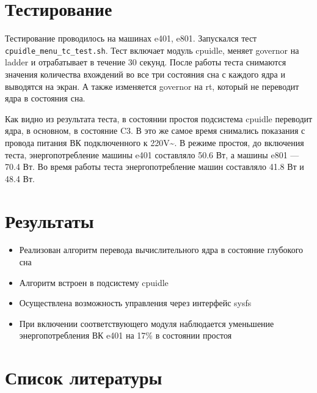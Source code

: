 \documentclass{article}
\begin{document}
%

\newpage
\section{Тестирование}
Тестирование проводилось на машинах e401, e801. Запускался тест \texttt{cpuidle\_menu\_tc\_test.sh}. Тест включает модуль cpuidle, меняет governor на ladder и отрабатывает в течение 30 секунд. После работы теста снимаются значения количества вхождений во все три состояния сна с каждого ядра и выводятся на экран. А также изменяется governor на rt, который не переводит ядра в состояния сна.

Как видно из результата теста, в состоянии простоя подсистема cpuidle переводит ядра, в основном, в состояние C3. В это же самое время снимались показания с провода питания ВК подключенного к 220V\textasciitilde. В режиме простоя, до включения теста, энергопотребление машины e401 составляло 50.6 Вт, а машины e801 --- 70.4 Вт. Во время работы теста энергопотребление машин составляло 41.8 Вт и 48.4 Вт.

\newpage
\section{Результаты}

\begin{itemize}
\item Реализован алгоритм перевода вычислительного ядра в состояние глубокого сна
\item Алгоритм встроен в подсистему cpuidle
\item Осуществлена возможность управления через интерфейс sysfs
\item При включении соответствующего модуля наблюдается уменьшение энергопотребления ВК e401 на 17\% в состоянии простоя 
\end{itemize}


\newpage
\section{Список литературы}
\end{document}
